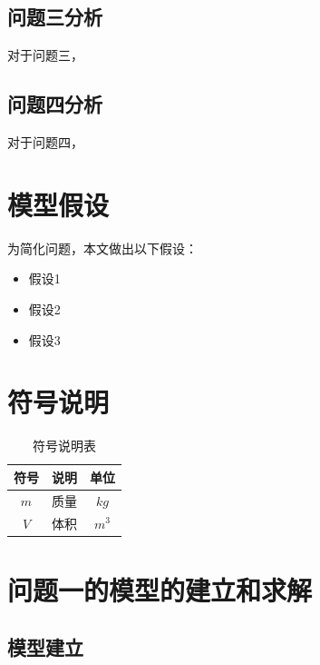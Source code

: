 \documentclass[withoutpreface,bwprint]{cumcmthesis}
\begin{document}
\subsection{问题三分析}
对于问题三，

\subsection{问题四分析}
对于问题四，


\section{模型假设}

为简化问题，本文做出以下假设：

\begin{itemize}[itemindent=2em]
\item 假设1
\item 假设2
\item 假设3
\end{itemize}


\section{符号说明}
\begin{table}[H]
\centering
\caption{符号说明表}
\begin{tabularx}{\textwidth}{CCC}
\toprule
符号    & 说明    & 单位 \\
\midrule
$m     $& 质量 & $kg$ \\
$V     $& 体积 & $m^3$ \\
\bottomrule
\end{tabularx}
\label{tab:符号说明}
\end{table}


\section{问题一的模型的建立和求解}
\subsection{模型建立}
\end{document}
